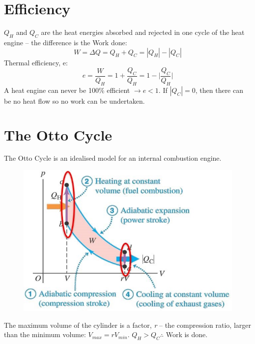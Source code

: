 \documentclass[a4paper, 11pt, normalem]{report}
\begin{document}
\section{Efficiency}
$Q_{H}$ and $Q_{C}$ are the heat energies absorbed and rejected in one cycle of the heat engine -- the difference is the Work done:
\begin{equation}
	W = {\Delta}Q = Q_{H} + Q_{C} = |Q_{H}| - |Q_{C}|
\end{equation}
Thermal efficiency, e:
\begin{equation}
	e = \frac{W}{Q_{H}} = 1 + \frac{Q_{C}}{Q_{H}} = 1 - \bigg|\frac{Q_{C}}{Q_{H}}\bigg|
\end{equation}
A heat engine can never be 100\% efficient $\rightarrow e < 1$.
If $|Q_{C}| = 0$, then there can be no heat flow so no work can be undertaken.

\section{The Otto Cycle}
The Otto Cycle is an idealised model for an internal combustion engine.
\begin{figure}[H]
    \centering
    \includegraphics[scale=0.8]{Otto.jpg}
\end{figure}
The maximum volume of the cylinder is a factor, \emph{r} -- the compression ratio, larger than the minimum volume: $V_{max} = rV_{min}$.
$Q_{H} > Q_{C} \therefore$ Work is done.
\end{document}

